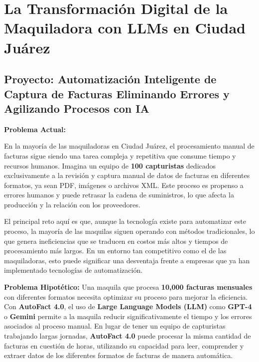 \documentclass[
  10pt,
  letterpaper,
]{book}
\begin{document}
\section{La Transformación Digital de la Maquiladora con LLMs en Ciudad
Juárez}\label{la-transformaciuxf3n-digital-de-la-maquiladora-con-llms-en-ciudad-juuxe1rez}

\subsection{\texorpdfstring{Proyecto: \textbf{Automatización Inteligente
de Captura de Facturas} Eliminando Errores y Agilizando Procesos con
IA}{Proyecto: Automatización Inteligente de Captura de Facturas Eliminando Errores y Agilizando Procesos con IA}}\label{proyecto-automatizaciuxf3n-inteligente-de-captura-de-facturas-eliminando-errores-y-agilizando-procesos-con-ia}

\textbf{Problema Actual:}

En la mayoría de las maquiladoras en Ciudad Juárez, el procesamiento
manual de facturas sigue siendo una tarea compleja y repetitiva que
consume tiempo y recursos humanos. Imagina un equipo de \textbf{100
capturistas} dedicados exclusivamente a la revisión y captura manual de
datos de facturas en diferentes formatos, ya sean PDF, imágenes o
archivos XML. Este proceso es propenso a errores humanos y puede
retrasar la cadena de suministros, lo que afecta la producción y la
relación con los proveedores.

El principal reto aquí es que, aunque la tecnología existe para
automatizar este proceso, la mayoría de las maquilas siguen operando con
métodos tradicionales, lo que genera ineficiencias que se traducen en
costos más altos y tiempos de procesamiento más largos. En un entorno
tan competitivo como el de las maquiladoras, esto puede significar una
desventaja frente a empresas que ya han implementado tecnologías de
automatización.

\textbf{Problema Hipotético:} Una maquila que procesa \textbf{10,000
facturas mensuales} con diferentes formatos necesita optimizar su
proceso para mejorar la eficiencia. Con \textbf{AutoFact 4.0}, el uso de
\textbf{Large Language Models (LLM)} como \textbf{GPT-4} o
\textbf{Gemini} permite a la maquila reducir significativamente el
tiempo y los errores asociados al proceso manual. En lugar de tener un
equipo de capturistas trabajando largas jornadas, \textbf{AutoFact 4.0}
puede procesar la misma cantidad de facturas en cuestión de horas,
utilizando su capacidad para leer, comprender y extraer datos de los
diferentes formatos de facturas de manera automática.
\end{document}
